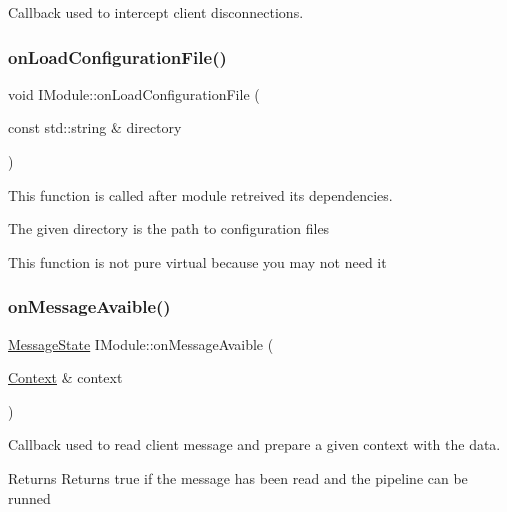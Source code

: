 Callback used to intercept client disconnections. 

\mbox{\label{classo_z_1_1_i_module_a61a2cc76594401ed2f50931a6a6b76f3}} 
\subsubsection{\texorpdfstring{onLoadConfigurationFile()}{onLoadConfigurationFile()}}
{\footnotesize\ttfamily void I\+Module\+::on\+Load\+Configuration\+File (\begin{DoxyParamCaption}\item[{const std\+::string \&}]{directory }\end{DoxyParamCaption})\hspace{0.3cm}{\ttfamily [virtual]}}



This function is called after module retreived its dependencies. 

The given directory is the path to configuration files

This function is not pure virtual because you may not need it \mbox{\label{classo_z_1_1_i_module_a241ee86ca88d4733ccea5a530fd1bbc9}} 
\subsubsection{\texorpdfstring{onMessageAvaible()}{onMessageAvailable()}}
{\footnotesize\ttfamily \mbox{\hyperlink{namespaceo_z_aca1addfd2374772c2b5db4bc5a96422c}{Message\+State}} I\+Module\+::on\+Message\+Avaible (\begin{DoxyParamCaption}\item[{\mbox{\hyperlink{classo_z_1_1_context}{Context}} \&}]{context }\end{DoxyParamCaption})\hspace{0.3cm}{\ttfamily [virtual]}}



Callback used to read client message and prepare a given context with the data. 

\begin{DoxyReturn}{Returns}
Returns true if the message has been read and the pipeline can be runned 
\end{DoxyReturn}
\mbox{\label{classo_z_1_1_i_module_a3dc905faa6df5e22eecc6ffbc923fd95}} 
